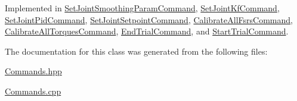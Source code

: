 Implemented in \hyperlink{classSetJointSmoothingParamCommand_a1ea658af81e810b3f5344816705a3c56}{Set\+Joint\+Smoothing\+Param\+Command}, \hyperlink{classSetJointKfCommand_a9b4b5e47aec44dd405273526a254b8cb}{Set\+Joint\+Kf\+Command}, \hyperlink{classSetJointPidCommand_aa7a930ba0a725cc63117682703a58bad}{Set\+Joint\+Pid\+Command}, \hyperlink{classSetJointSetpointCommand_a7f1341d238595b02a660fb55aef9bc45}{Set\+Joint\+Setpoint\+Command}, \hyperlink{classCalibrateAllFsrsCommand_af0f05f335047e419fb8edb459205f5ae}{Calibrate\+All\+Fsrs\+Command}, \hyperlink{classCalibrateAllTorquesCommand_a5c63662eccb63e656139bcac460e5eb8}{Calibrate\+All\+Torques\+Command}, \hyperlink{classEndTrialCommand_ac07f0eddff9b21da6cb302489aac19c7}{End\+Trial\+Command}, and \hyperlink{classStartTrialCommand_a3b3772ca308e89554da05751a3255e4f}{Start\+Trial\+Command}.



The documentation for this class was generated from the following files\+:\begin{DoxyCompactItemize}
\item 
\hyperlink{Commands_8hpp}{Commands.\+hpp}\item 
\hyperlink{Commands_8cpp}{Commands.\+cpp}\end{DoxyCompactItemize}
